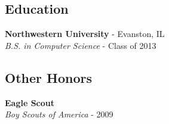 \documentclass[12pt]{article}
\begin{document}
\begin{paracol}{2}
\subsection*{Education}
\textbf{Northwestern University} - Evanston, IL \\
\textit{B.S. in Computer Science} - {\footnotesize{Class of 2013}}

\subsection*{Other Honors}
\textbf{Eagle Scout} \\
\textit{Boy Scouts of America} - {\footnotesize{2009}}
    
\end{paracol}
\end{document}
